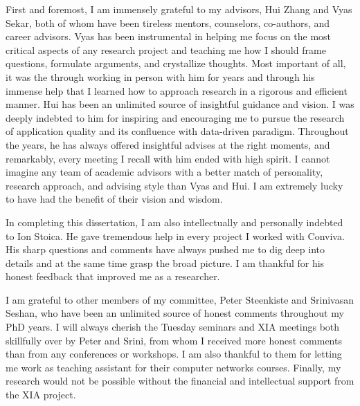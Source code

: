 \documentclass[12pt]{ZHU-cmuthesis}
\begin{document}
\begin{acknowledgments}


First and foremost, I am immensely grateful to my advisors, Hui Zhang and Vyas Sekar,
both of whom have been tireless mentors, counselors, co-authors, and career advisors. 
Vyas has been instrumental in helping me focus on the most critical aspects of any research project and teaching me how I should frame questions, formulate arguments, and crystallize thoughts. Most important of all, it was the through working in person with him for years and through his immense help that I learned how to approach research in a rigorous and efficient manner. 
Hui has been an unlimited source of insightful guidance and vision. I was deeply indebted to him for inspiring and encouraging me to pursue the research of application quality and its confluence with data-driven paradigm. Throughout the years, he has always offered insightful advises at the right moments, and remarkably, every meeting I recall with him ended with high spirit.
I cannot imagine any team of academic advisors with a better match of personality, research approach, and advising style than Vyas and Hui. I am extremely lucky to have had the benefit of their vision and wisdom. 

%
In completing this dissertation, I am also intellectually and personally indebted to Ion Stoica. He gave tremendous help in every project I worked with Conviva. His sharp questions and comments have always pushed me to dig deep into details and at the same time grasp the broad picture.
I am thankful for his honest feedback that improved me as a researcher.

%
I am grateful to other members of my committee, Peter Steenkiste and Srinivasan Seshan, who have been an unlimited source of honest comments throughout my PhD years. 
I will always cherish the Tuesday seminars and XIA meetings both skillfully over by Peter and Srini, from whom I received more honest comments than from any conferences or workshops. I am also thankful to them for letting me work as teaching assistant for their computer networks courses.
Finally, my research would not be possible without the financial and intellectual support from the XIA project. 


\end{acknowledgments}
\end{document}
